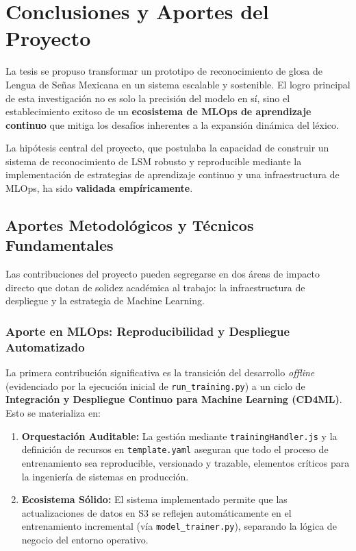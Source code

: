\chapter{Conclusiones y Aportes del Proyecto}
\label{chap:conclusiones}

\par La tesis se propuso transformar un prototipo de reconocimiento de glosa de Lengua de Señas Mexicana en un sistema escalable y sostenible. El logro principal de esta investigación no es solo la precisión del modelo en sí, sino el establecimiento exitoso de un \textbf{ecosistema de MLOps de aprendizaje continuo} que mitiga los desafíos inherentes a la expansión dinámica del léxico.

\par La hipótesis central del proyecto, que postulaba la capacidad de construir un sistema de reconocimiento de LSM robusto y reproducible mediante la implementación de estrategias de aprendizaje continuo y una infraestructura de MLOps, ha sido \textbf{validada empíricamente}.

\section{Aportes Metodológicos y Técnicos Fundamentales}
\label{sec:aportes}

Las contribuciones del proyecto pueden segregarse en dos áreas de impacto directo que dotan de solidez académica al trabajo: la infraestructura de despliegue y la estrategia de Machine Learning.

\subsection{Aporte en MLOps: Reproducibilidad y Despliegue Automatizado}
\par La primera contribución significativa es la transición del desarrollo \textit{offline} (evidenciado por la ejecución inicial de \lstinline|run_training.py|) a un ciclo de \textbf{Integración y Despliegue Continuo para Machine Learning (CD4ML)}. Esto se materializa en:
\begin{enumerate}
    \item \textbf{Orquestación Auditable:} La gestión mediante \lstinline|trainingHandler.js| y la definición de recursos en \lstinline|template.yaml| aseguran que todo el proceso de entrenamiento sea reproducible, versionado y trazable, elementos críticos para la ingeniería de sistemas en producción.
    \item \textbf{Ecosistema Sólido:} El sistema implementado permite que las actualizaciones de datos en S3 se reflejen automáticamente en el entrenamiento incremental (vía \lstinline|model_trainer.py|), separando la lógica de negocio del entorno operativo.
\end{enumerate}

